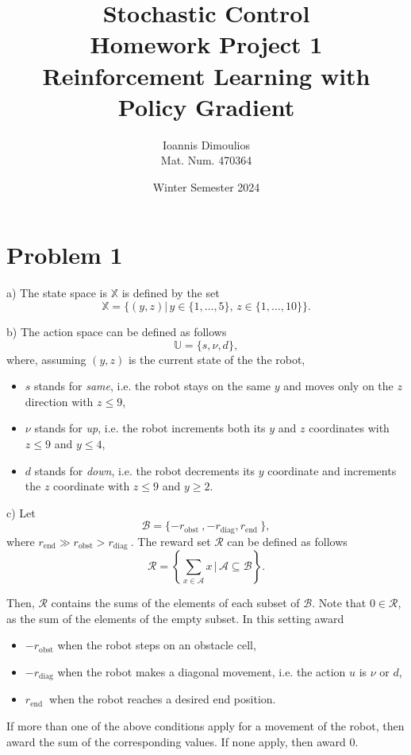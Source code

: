 \documentclass[12pt]{article}
\title{\vspace{-2cm} Stochastic Control \\ 
        \large Homework Project 1 \\
        Reinforcement Learning with Policy Gradient}
\author{Ioannis Dimoulios \\ 
        \small Mat. Num. 470364}
\date{Winter Semester 2024}
\begin{document}
\maketitle

\section*{Problem 1} 
a) The state space is \(\mathbb{X}\) is defined by the set 
\begin{equation*}
    \mathbb{X} = \{(y, z) | \, y \in \{1, \ldots, 5\}, \, z \in \{1, \ldots, 10\}\}. 
\end{equation*}

b) The action space can be defined as follows
\begin{equation*}
    \mathbb{U} = \{s, \nu, d\}, 
\end{equation*}
where, assuming \( (y, z) \) is the current state of the the robot,  
\begin{itemize}
    \item \(s \) stands for \textit{same}, i.e. the robot stays on the same \(y \) and moves only on the \(z \) direction with \(z \leq 9 \),
    \item \(\nu \) stands for \textit{up}, i.e. the robot increments both its \(y \) and \(z \) coordinates with \(z \leq 9 \) and \(y \leq 4\), 
    \item \(d \) stands for \textit{down}, i.e. the robot decrements its \(y \) coordinate and increments the \(z \) coordinate with \(z \leq 9 \) and \(y \geq 2\).
\end{itemize}

c) Let 
\begin{equation*}
    \mathcal{B} = \{-r_\text{obst }, -r_\text{diag}, r_\text{end }\},
\end{equation*} 
where \(r_\text{end} \gg r_\text{obst} > r_\text{diag } \). 
The reward set \(\mathcal{R }\) can be defined as follows
\begin{equation*}
    \mathcal{R } = \left\{\sum_{x \in \mathcal{A}} x \, \big| \, \mathcal{A }  \subseteq \mathcal{B}\right\}.
\end{equation*}

Then, \(\mathcal{R }\) contains the sums of the elements of each subset of \(\mathcal{B }\). Note that \(0 \in \mathcal{R }\), as the sum of the elements of the empty subset. In this setting award 
\begin{itemize}
    \item \(-r_\text{obst} \) when the robot steps on an obstacle cell, 
    \item \(-r_\text{diag} \) when the robot makes a diagonal movement, i.e. the action \(u \) is \(\nu \) or \(d \), 
    \item \(r_\text{end }\) when the robot reaches a desired end position. 
\end{itemize}
If more than one of the above conditions apply for a movement of the robot, then award the sum of the corresponding values. If none apply, then award \(0\). \\
\end{document}
